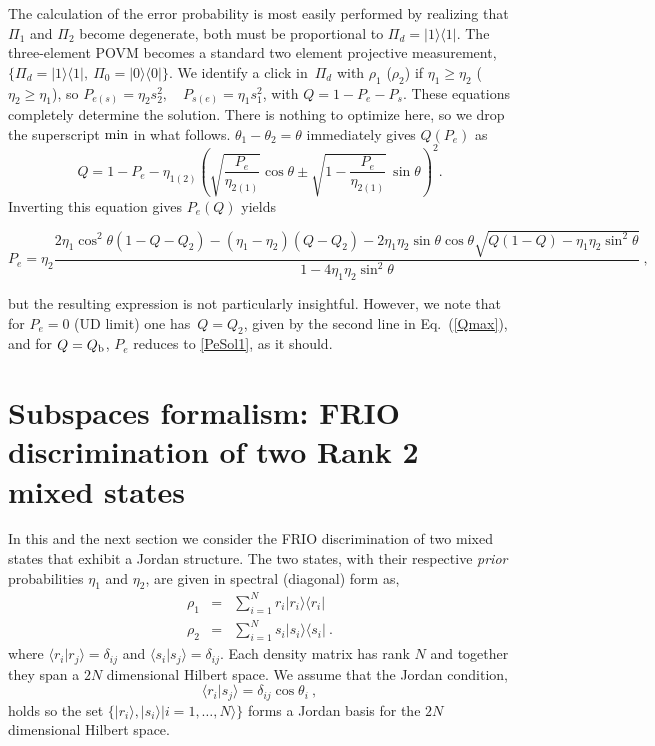 \documentclass[aps,pra,twocolumn,eqsecnum,showpacs]{revtex4}
\begin{document}
The calculation of the error probability is most easily performed by realizing that $\Pi_1$ and $\Pi_2$ become degenerate, both must be
proportional to $\Pi_{d}=|1\rangle\langle1|$. The three-element POVM becomes a standard two element projective measurement,
$\{\Pi_d=|1\rangle\langle1|, \  \Pi_0=|0\rangle\langle0| \}$.
We identify a click in~$\Pi_{d}$ with $\rho_{1}$ ($\rho_{2}$)  if $\eta_1\ge\eta_2$ ($\eta_2\ge\eta_1$), so $P_{e(s)}=\eta_2 s_2^2, \quad P_{s(e)}=\eta_1 s_1^2$, with $Q=1-P_e-P_s$. These equations completely determine the solution. There is nothing to optimize here, so we drop the superscript $\rm min$ in what follows. $\theta_1-\theta_2=\theta$ immediately gives $Q(P_e)$ as
\begin{equation}
Q\!=\!1\! -\! P_{e}\! - \eta_{1(2)}\!\!\left(\!\sqrt{\!\frac{P_e}{\eta_{2(1)}}}\cos\theta\!\pm\!\sqrt{1\!-\!\frac{P_e}{\eta_{2(1)}}}\,\sin\theta\!\right)^{\!2}\!.
\label{PeSol2}
\end{equation}
Inverting this equation gives $P_e(Q)$ yields
\begin{widetext}
\begin{equation}
P_{e}=\eta_{2}\frac{2\eta_{1}\cos^{2}\theta(1-Q-Q_{2}) - (\eta_{1}-\eta_{2})(Q-Q_{2})-2\eta_{1}\eta_{2}\sin\theta\cos\theta\sqrt{Q(1-Q)-\eta_{1}\eta_{2}\sin^{2}\theta}}{1-4\eta_{1}\eta_{2}\sin^{2}\theta} \ ,
\label{PeSol2Exp}
\end{equation}
\end{widetext}
but the resulting expression is not particularly insightful.  However, we note that for $P_e=0$ (UD limit) one has~$Q=Q_{2}$, given by the second line in Eq.~(\ref{Qmax}), and for $Q = Q_{\rm b}$, $P_{e}$ reduces to \eqref{PeSol1}, as it should.



\section{Subspaces formalism: FRIO discrimination of two Rank 2 mixed states}
\label{sec:3}

In this and the next section we consider the FRIO discrimination of two mixed states that exhibit a Jordan structure. The two states, with their respective \emph{prior} probabilities $\eta_1$ and $\eta_2$,  are given in spectral (diagonal) form as, 
\begin{eqnarray}
 \rho_1 &=& \sum_{i=1}^{N} r_i \vert r_i \rangle \langle r_i \vert \nonumber \\
 \rho_2 &=& \sum_{i=1}^{N} s_i \vert s_i \rangle \langle s_i \vert \ . 
\label{rho1and2}
\end{eqnarray}
where $\langle r_{i}\vert r_{j}\rangle = \delta_{ij}$ and $\langle s_{i}\vert s_{j}\rangle = \delta_{ij}$. Each density matrix has rank $N$ and together they span a $2N$ dimensional Hilbert space. We assume that the Jordan condition,  
\begin{equation}
\langle r_i \vert s_j \rangle = \delta_{ij} \cos \theta_i \ ,
\label{jordan}
\end{equation}
holds so the set $\{\vert r_{i}\rangle, \vert s_{i}\rangle\vert i=1,\ldots,N\rangle\}$ forms a Jordan basis for the $2N$ dimensional Hilbert space. 
\end{document}
